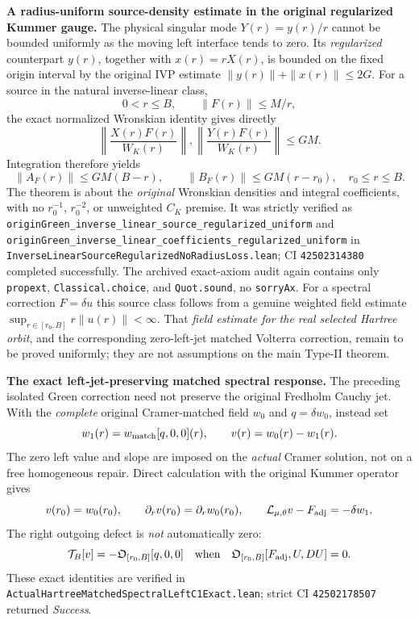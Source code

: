 \documentclass[11pt]{amsart}
\begin{document}
\medskip
\noindent\textbf{A radius-uniform source-density estimate in the
original regularized Kummer gauge.}
The physical singular mode \(Y(r)=y(r)/r\) cannot be bounded uniformly
as the moving left interface tends to zero. Its \emph{regularized}
counterpart \(y(r)\), together with \(x(r)=rX(r)\), is bounded on
the fixed origin interval by the original IVP estimate
\(
\|y(r)\|+\|x(r)\|\le2G
\).
For a source in the natural inverse-linear class,
\[
 0<r\le B,\qquad \|F(r)\|\le M/r,
\]
the exact normalized Wronskian identity gives directly
\[
 \boxed{
 \left\|\frac{X(r)F(r)}{W_K(r)}\right\|,
 \left\|\frac{Y(r)F(r)}{W_K(r)}\right\|\le GM.
 }
\]
Integration therefore yields
\[
 \|A_F(r)\|\le GM(B-r),\qquad
 \|B_F(r)\|\le GM(r-r_0),
 \quad r_0\le r\le B.
\]
The theorem is about the \emph{original} Wronskian densities and
integral coefficients, with no \(r_0^{-1}\), \(r_0^{-2}\), or
unweighted \(C_K\) premise.
It was strictly verified as
\texttt{originGreen\_inverse\_linear\_source\_regularized\_uniform}
and
\texttt{originGreen\_inverse\_linear\_coefficients\_regularized\_uniform}
in
\texttt{InverseLinearSourceRegularizedNoRadiusLoss.lean};
CI \texttt{42502314380} completed successfully. The archived
exact-axiom audit again contains only
\texttt{propext}, \texttt{Classical.choice}, and
\texttt{Quot.sound}, no \texttt{sorryAx}.
For a spectral correction \(F=\delta u\) this source class follows
from a genuine weighted field estimate
\(\sup_{r\in[r_0,B]}r\|u(r)\|<\infty\).
That \emph{field estimate for the real selected Hartree orbit},
and the corresponding zero-left-jet matched Volterra correction,
remain to be proved uniformly; they are not assumptions on
the main Type-II theorem.


\medskip
\noindent\textbf{The exact left-jet-preserving matched spectral response.}
The preceding isolated Green correction need not preserve the
original Fredholm Cauchy jet. With the \emph{complete} original
Cramer-matched field $w_0$ and $q=\delta w_0$, instead set
\[
 w_1(r)=w_{\rm match}[q,0,0](r),
 \qquad
 v(r)=w_0(r)-w_1(r).
\]
The zero left value and slope are imposed on the \emph{actual}
Cramer solution, not on a free homogeneous repair. Direct calculation
with the original Kummer operator gives
\[
 v(r_0)=w_0(r_0),\qquad
 \partial_rv(r_0)=\partial_rw_0(r_0),\qquad
 {\cal L}_{\mu,\theta}v-F_{\rm adj}=-\delta w_1 .
\]
The right outgoing defect is \emph{not} automatically zero:
\[
 {\cal T}_{B}[v]
   =-\mathfrak O_{[r_0,B]}[q,0,0]
   \quad\text{when}\quad
   \mathfrak O_{[r_0,B]}[F_{\rm adj},U,DU]=0.
\]
These exact identities are verified in
\texttt{ActualHartreeMatchedSpectralLeftC1Exact.lean};
strict CI \texttt{42502178507} returned \emph{Success}.
\end{document}
